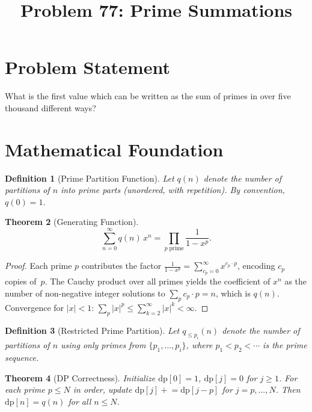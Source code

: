 \documentclass[11pt]{article}
\title{Problem 77: Prime Summations}
\author{}
\date{}
\newtheorem{theorem}{Theorem}
\newtheorem{definition}[theorem]{Definition}
\begin{document}
\maketitle

\section{Problem Statement}

What is the first value which can be written as the sum of primes in over five thousand different ways?

\section{Mathematical Foundation}

\begin{definition}[Prime Partition Function]
Let $q(n)$ denote the number of partitions of $n$ into prime parts (unordered, with repetition). By convention, $q(0) = 1$.
\end{definition}

\begin{theorem}[Generating Function]
\[
\sum_{n=0}^{\infty} q(n)\,x^n = \prod_{p \;\text{prime}} \frac{1}{1 - x^p}.
\]
\end{theorem}

\begin{proof}
Each prime $p$ contributes the factor $\frac{1}{1-x^p} = \sum_{c_p=0}^{\infty} x^{c_p \cdot p}$, encoding $c_p$ copies of~$p$. The Cauchy product over all primes yields the coefficient of $x^n$ as the number of non-negative integer solutions to $\sum_p c_p \cdot p = n$, which is $q(n)$. Convergence for $|x| < 1$: $\sum_p |x|^p \leq \sum_{k=2}^{\infty} |x|^k < \infty$.
\end{proof}

\begin{definition}[Restricted Prime Partition]
Let $q_{\le p_i}(n)$ denote the number of partitions of $n$ using only primes from $\{p_1, \ldots, p_i\}$, where $p_1 < p_2 < \cdots$ is the prime sequence.
\end{definition}

\begin{theorem}[DP Correctness]
Initialize $\mathrm{dp}[0] = 1$, $\mathrm{dp}[j] = 0$ for $j \geq 1$. For each prime $p \leq N$ in order, update $\mathrm{dp}[j] \mathrel{+}= \mathrm{dp}[j-p]$ for $j = p, \ldots, N$. Then $\mathrm{dp}[n] = q(n)$ for all $n \leq N$.
\end{theorem}
\end{document}

